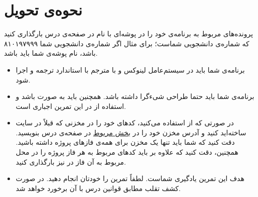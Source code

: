 \documentclass{utap}
\begin{document}
    \section{نحوه‌ی تحویل}
        پرونده‌‌های مربوط به برنامه‌ی خود را در پوشه‌ای با نام  در صفحه‌ی  درس بارگذاری کنید که  شماره‌ی دانشجویی شماست؛ برای مثال اگر شماره‌ی دانشجویی شما ۸۱۰۱۹۷۹۹۹ باشد، نام پوشه‌ی شما باید  باشد.
        \begin{itemize}
            \item
                        برنامه‌ی شما باید در سیستم‌عامل لینوکس و با مترجم  با استاندارد  ترجمه و اجرا شود.
                    \item
                        برنامه‌ی شما باید حتما طراحی شیءگرا داشته باشد. همچنین باید به صورت  باشد و استفاده از  در این تمرین اجباری است.
            \item 
            در صورتی که از  استفاده می‌کنید، کد‌های خود را در مخزنی
             که قبلاً در سایت
             ساخته‌اید  کنید و آدرس مخزن خود را در 
            \href{https://cecm.ut.ac.ir/mod/assign/view.php?id=83793}{بخش مربوط}
              در صفحه‌ی درس بنویسید.
            دقت کنید که شما باید تنها یک مخزن برای همه‌ی فازهای پروژه داشته باشید.
            همچنین، دقت کنید که علاوه بر  باید کدهای مربوط به هر فاز پروژه را در محل مربوط به آن فاز در  نیز بارگذاری کنید.
                    \item
                        هدف این تمرین یادگیری شماست. لطفاً تمرین را خودتان انجام دهید. در صورت کشف تقلب مطابق قوانین درس با آن برخورد خواهد شد.
        \end{itemize}
\end{document}
